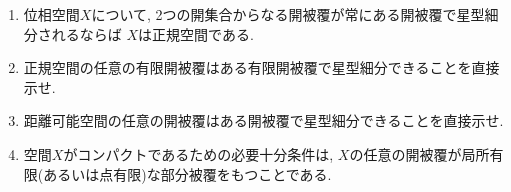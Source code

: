 \documentclass[uplatex, dvipdfmx, a4paper, 12pt, class=jsarticle, crop=false]{standalone}
\begin{document}
\begin{problem}[5.1.A]\label{eng-5-1-A-problem}
    \begin{enumerate}
        \item {}位相空間\(X\)について,
        2つの開集合からなる開被覆が常にある開被覆で星型細分されるならば
        \(X\)は正規空間である.

        \item 正規空間の任意の有限開被覆はある有限開被覆で星型細分できることを直接示せ.

        \item 距離可能空間の任意の開被覆はある開被覆で星型細分できることを直接示せ.

        \item \Hausdorff 空間\(X\)がコンパクトであるための必要十分条件は,
        \(X\)の任意の開被覆が局所有限(あるいは点有限)な部分被覆をもつことである.
    \end{enumerate}
\end{problem}
\end{document}
